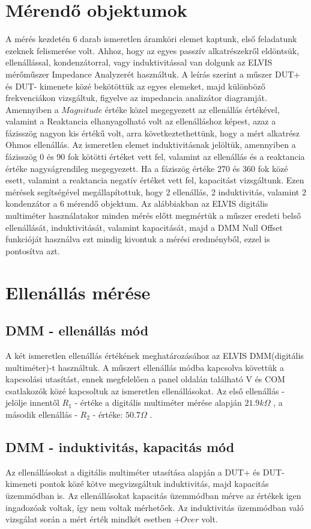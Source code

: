 \documentclass[10pt, conference,a4paper]{ITKproc}
\begin{document}
\section{Mérendő objektumok}
A mérés kezdetén 6 darab ismeretlen áramköri elemet kaptunk, első feladatunk ezeknek felismerése volt. Ahhoz, hogy az egyes passzív alkatrészekről eldöntsük, ellenállással, kondenzátorral, vagy induktivitással van dolgunk az ELVIS mérőműszer Impedance Analyzerét használtuk. A leírás szerint a műszer DUT+ és DUT- kimenete közé bekötöttük az egyes elemeket, majd különböző frekvenciákon vizsgáltuk, figyelve az impedancia analizátor diagramját. Amennyiben a $Magnitude$ értéke közel megegyezett az ellenállás értékével, valamint a Reaktancia elhanyagolható volt az ellenálláshoz képest, azaz a fázisszög nagyon kis értékű volt, arra következtethettünk, hogy a mért alkatrész Ohmos ellenállás. Az ismeretlen elemet induktivitásnak jelöltük, amennyiben a fázisszög 0 és 90 fok kötötti értéket vett fel, valamint az ellenállás és a reaktancia értéke nagyságrendileg megegyezett. Ha a fáziszög értéke 270 és 360 fok közé esett, valamint a reaktancia negatív értéket vett fel, kapacitást vizsgáltunk. Ezen mérések segítségével megállapítottuk, hogy 2 ellenállás, 2 induktivitás, valamint 2 kondenzátor a 6 mérendő objektum. 
Az alábbiakban az ELVIS digitális multiméter használatakor minden mérés előtt megmértük a műszer eredeti belső ellenállását, induktivitását, valamint kapacitását, majd a DMM Null Offset funkcióját használva ezt mindig kivontuk a mérési eredményből, ezzel is pontosítva azt. 
\section{Ellenállás mérése}
\subsection{DMM - ellenállás mód}
A két ismeretlen ellenállás értékének meghatározásához az ELVIS DMM(digitális multiméter)-t használtuk. A műszert ellenállás módba kapcsolva követtük a kapcsolási utasítást, ennek megfelelően a panel oldalán található V és COM csatlakozók közé kapcsoltuk az ismeretlen ellenállásokat. Az első ellenállás - jelölje innentől $R_1$ - értéke a digitális multiméter mérése alapján $21.9 k\Omega$ , a második ellenállás - $R_2$ - értéke: $50.7\Omega$ . 
\subsection{DMM - induktivitás, kapacitás mód}
Az ellenállásokat a digitális multiméter utasítása alapján a DUT+ és DUT- kimeneti pontok közé kötve megvizsgáltuk induktivitás, majd kapacitás üzemmódban is. Az ellenállásokat kapacitás üzemmódban mérve az értékek igen ingadozóak voltak, így nem voltak mérhetőek. Az induktivitás üzemmódban való vizsgálat során a mért érték mindkét esetben $+Over$ volt. 
\end{document}
